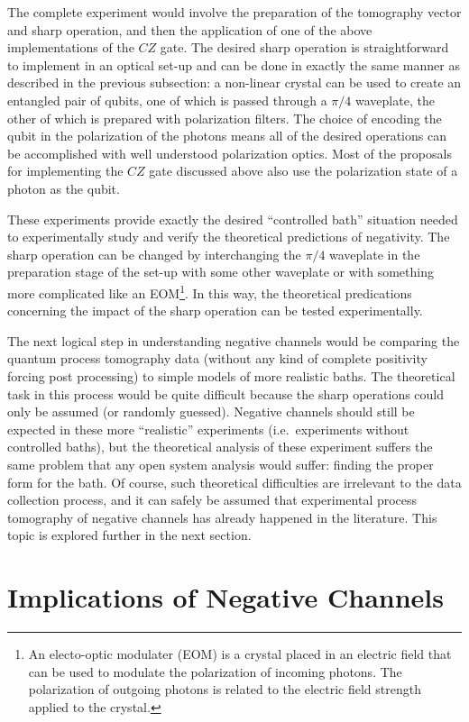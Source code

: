 The complete experiment would involve the preparation of the tomography vector and sharp operation, and then the application of one of the above implementations of the $CZ$ gate.  The desired sharp operation is straightforward to implement in an optical set-up and can be done in exactly the same manner as described in the previous subsection: a non-linear crystal can be used to create an entangled pair of qubits, one of which is passed through a $\pi/4$ waveplate, the other of which is prepared with polarization filters.  The choice of encoding the qubit in the polarization of the photons means all of the desired operations can be accomplished with well understood polarization optics.  Most of the proposals for implementing the $CZ$ gate discussed above also use the polarization state of a photon as the qubit. 

These experiments provide exactly the desired ``controlled bath'' situation needed to experimentally study and verify the theoretical predictions of negativity.  The sharp operation can be changed by interchanging the $\pi/4$ waveplate in the preparation stage of the set-up with some other waveplate or with something more complicated like an EOM\footnote{An electo-optic modulater (EOM) is a crystal placed in an electric field that can be used to modulate the polarization of incoming photons.  The polarization of outgoing photons is related to the electric field strength applied to the crystal.}.  In this way, the theoretical predications concerning the impact of the sharp operation can be tested experimentally.  

The next logical step in understanding negative channels would be comparing the quantum process tomography data (without any kind of complete positivity forcing post processing) to simple models of more realistic baths.  The theoretical task in this process would be quite difficult because the sharp operations could only be assumed (or randomly guessed).  Negative channels should still be expected in these more ``realistic'' experiments (i.e.\ experiments without controlled baths), but the theoretical analysis of these experiment suffers the same problem that any open system analysis would suffer: finding the proper form for the bath.  Of course, such theoretical difficulties are irrelevant to the data collection process, and it can safely be assumed that experimental process tomography of negative channels has already happened in the literature.  This topic is explored further in the next section.

\section{Implications of Negative Channels}


